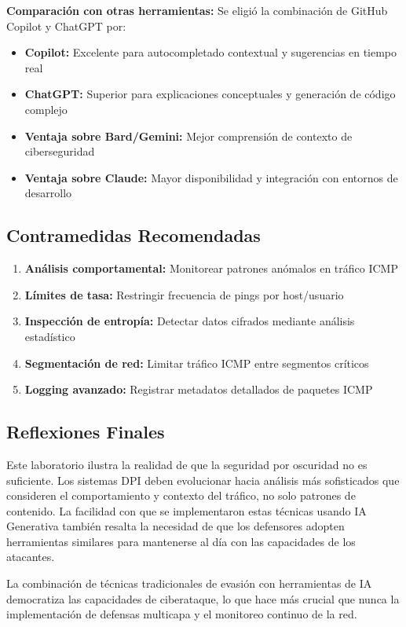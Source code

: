 \documentclass[letter,12pt]{article}
\begin{document}
\textbf{Comparación con otras herramientas:}
Se eligió la combinación de GitHub Copilot y ChatGPT por:
\begin{itemize}
    \item \textbf{Copilot:} Excelente para autocompletado contextual y sugerencias en tiempo real
    \item \textbf{ChatGPT:} Superior para explicaciones conceptuales y generación de código complejo
    \item \textbf{Ventaja sobre Bard/Gemini:} Mejor comprensión de contexto de ciberseguridad
    \item \textbf{Ventaja sobre Claude:} Mayor disponibilidad y integración con entornos de desarrollo
\end{itemize}

\subsection*{Contramedidas Recomendadas}

\begin{enumerate}
    \item \textbf{Análisis comportamental:} Monitorear patrones anómalos en tráfico ICMP
    \item \textbf{Límites de tasa:} Restringir frecuencia de pings por host/usuario
    \item \textbf{Inspección de entropía:} Detectar datos cifrados mediante análisis estadístico
    \item \textbf{Segmentación de red:} Limitar tráfico ICMP entre segmentos críticos
    \item \textbf{Logging avanzado:} Registrar metadatos detallados de paquetes ICMP
\end{enumerate}

\subsection*{Reflexiones Finales}

Este laboratorio ilustra la realidad de que la seguridad por oscuridad no es suficiente. Los sistemas DPI deben evolucionar hacia análisis más sofisticados que consideren el comportamiento y contexto del tráfico, no solo patrones de contenido. La facilidad con que se implementaron estas técnicas usando IA Generativa también resalta la necesidad de que los defensores adopten herramientas similares para mantenerse al día con las capacidades de los atacantes.

La combinación de técnicas tradicionales de evasión con herramientas de IA democratiza las capacidades de ciberataque, lo que hace más crucial que nunca la implementación de defensas multicapa y el monitoreo continuo de la red.
\end{document}

